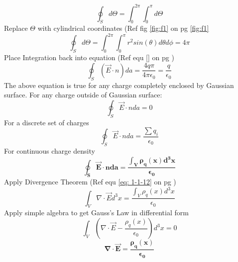 \documentclass[12pt]{article}
\begin{document}
    \begin{equation}
        \oint_S d\Theta = \int_0^{2 \pi} \int_0^\pi d\Theta
    \end{equation}
    \newline Replace $\Theta$ with cylindrical coordinates (Ref fig \ref{fig:f1} on pg \ref{fig:f1}
    \begin{equation}
        \oint_S d\Theta = \int_0^{2 \pi} \int_0^\pi r^2 sin(\theta) d \theta d \phi = 4 \pi
    \end{equation}
    \newline Place Integration back into equation (Ref equ \ref{} on pg \pageref{})
    \begin{equation}
        \oint_S (\vec{E} \cdot n) da = \frac{4 q \pi}{4 \pi \epsilon_0} = \frac{q}{\epsilon_0}
    \end{equation}
    \newline The above equation is true for any charge completely enclosed by Gaussian surface. For any charge outside of Gaussian surface:
    \begin{equation}
        \oint_S \vec{E} \cdot n da = 0
    \end{equation}
    \newline For a discrete set of charges 
    \begin{equation}
        \oint_S \vec{E} \cdot n da = \frac{\sum q_i}{\epsilon_0}
    \end{equation}
    \newline For continuous charge density
    \begin{equation}
        \boxed{\boldsymbol{\oint_S \vec{E} \cdot n da = \frac{\int_V \rho_q(x) d^3 x}{\epsilon_0}}}
    \end{equation}
    \newline Apply Divergence Theorem (Ref equ \ref{eq: 1-1-12} on pg \pageref{eq: 1-1-12})
    \begin{equation}
        \int_V \nabla \cdot \vec{E} d^3 x = \frac{\int_V \rho_q(x) d^3 x}{\epsilon_0}
    \end{equation}
    \newline Apply simple algebra to get Gauss's Law in differential form
    \begin{equation}
        \int_V (\nabla \cdot \vec{E} - \frac{\rho_q(x)}{\epsilon_0}) d^3 x = 0
    \end{equation}
    \begin{equation}
        \boxed{\boldsymbol{\nabla \cdot \vec{E}= \frac{\rho_q(x)}{\epsilon_0}}}
    \end{equation}
\end{document}
